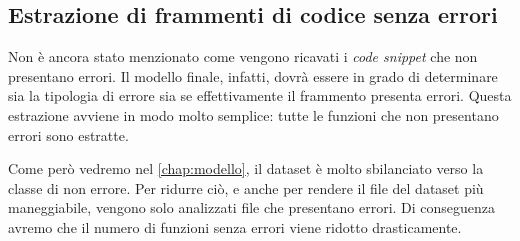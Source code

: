 \subsection{Estrazione di frammenti di codice senza errori}
Non è ancora stato menzionato come vengono ricavati i \textit{code snippet} che non presentano errori.
Il modello finale, infatti, dovrà essere in grado di determinare sia la tipologia di errore sia se effettivamente il frammento presenta errori.
Questa estrazione avviene in modo molto semplice: tutte le funzioni che non presentano errori sono estratte. 

Come però vedremo nel \autoref{chap:modello}, il dataset è molto sbilanciato verso la classe di non errore.
Per ridurre ciò, e anche per rendere il file del dataset più maneggiabile, vengono solo analizzati file che presentano errori.
Di conseguenza avremo che il numero di funzioni senza errori viene ridotto drasticamente. 






